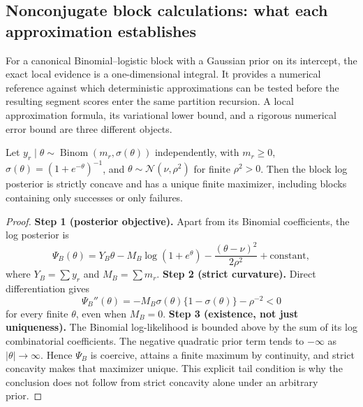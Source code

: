 \subsection{Nonconjugate block calculations: what each approximation establishes}
\label{sec:nonconjugate-derivations}
For a canonical Binomial--logistic block with a Gaussian prior on its intercept, the exact local evidence is a one-dimensional integral. It provides a numerical reference against which deterministic approximations can be tested before the resulting segment scores enter the same partition recursion. A local approximation formula, its variational lower bound, and a rigorous numerical error bound are three different objects.

\begin{lemma}
\label{lem:logistic-mode-paper}
Let $y_r\mid\theta\sim\operatorname{Binom}(m_r,\sigma(\theta))$ independently, with $m_r\ge0$, $\sigma(\theta)=(1+e^{-\theta})^{-1}$, and $\theta\sim\mathcal N(\nu,\rho^2)$ for finite $\rho^2>0$. Then the block log posterior is strictly concave and has a unique finite maximizer, including blocks containing only successes or only failures.
\end{lemma}
\begin{proof}
\textbf{Step 1 (posterior objective).} Apart from its Binomial coefficients, the log posterior is
\[
\Psi_B(\theta)=Y_B\theta-M_B\log(1+e^\theta)
-\frac{(\theta-\nu)^2}{2\rho^2}+\mathrm{constant},
\]
where $Y_B=\sum y_r$ and $M_B=\sum m_r$.
\textbf{Step 2 (strict curvature).} Direct differentiation gives
\[
\Psi_B''(\theta)=-M_B\sigma(\theta)\{1-\sigma(\theta)\}-\rho^{-2}<0
\]
for every finite $\theta$, even when $M_B=0$.
\textbf{Step 3 (existence, not just uniqueness).} The Binomial log-likelihood is bounded above by the sum of its log combinatorial coefficients. The negative quadratic prior term tends to $-\infty$ as $|\theta|\to\infty$. Hence $\Psi_B$ is coercive, attains a finite maximum by continuity, and strict concavity makes that maximizer unique. This explicit tail condition is why the conclusion does not follow from strict concavity alone under an arbitrary prior.
\end{proof}

